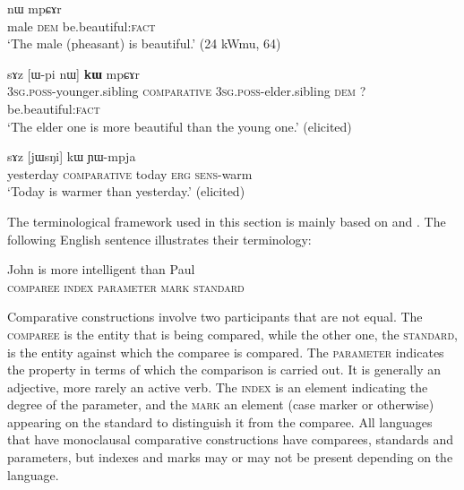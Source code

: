\documentclass[oldfontcommands,oneside,a4paper,11pt]{article}
\newcommand{\ipa}[1]{{\phon #1}} %
\begin{document}
\begin{exe}
\ex \label{ex:simple}
\gll  \ipa{pʰu}   	\ipa{nɯ}   \ipa{mpɕɤr}     \\
  male \textsc{dem}    be.beautiful:\textsc{fact} \\
\glt `The male (pheasant) is beautiful.' (24 kWmu, 64)
\end{exe}

\begin{exe}
\ex \label{ex:comp1}
\gll  \ipa{ɯ-ʁi}   	\ipa{sɤz}   	[\ipa{ɯ-pi}   	\ipa{nɯ}]   	\ipa{\textbf{kɯ}}   	\ipa{mpɕɤr}     \\
\textsc{3sg.poss}-younger.sibling \textsc{comparative} \textsc{3sg.poss}-elder.sibling \textsc{dem} ?{ }  be.beautiful:\textsc{fact} \\
\glt `The elder one is more beautiful than the young one.' (elicited)
\end{exe}
 
 
\begin{exe}
\ex \label{ex:comparative.complete}
\gll \ipa{jɯfɕɯr}   	\ipa{sɤz }   	[\ipa{jɯsŋi}]   	\ipa{kɯ}   	\ipa{ɲɯ-mpja}   \\
yesterday \textsc{comparative} today \textsc{erg} \textsc{sens}-warm \\
\glt `Today is warmer than yesterday.' (elicited)
\end{exe}

The terminological framework used in this section is mainly based on \citet{dixon08comparative} and \citet{stassen11comparative}. The following English sentence   illustrates their  terminology:

\begin{exe}
\ex \label{ex:comp.eng}
\gll  John is more intelligent than Paul \\
\textsc{comparee} { } \textsc{index} \textsc{parameter} \textsc{mark} \textsc{standard}  \\
\end{exe}

Comparative constructions involve two participants that are not equal. The \textsc{comparee} is  the entity that is being compared, while the other one, the \textsc{standard}, is the entity against which the comparee is compared. The \textsc{parameter} indicates the property in terms of which the comparison is carried out. It is generally an adjective, more rarely an active verb. The \textsc{index} is an element indicating the degree of the parameter, and the \textsc{mark} an element (case marker or otherwise) appearing on the standard to distinguish it from the comparee. All languages that have monoclausal comparative constructions have comparees, standards and parameters, but indexes and marks may or may not be present depending on the language.
\end{document}
